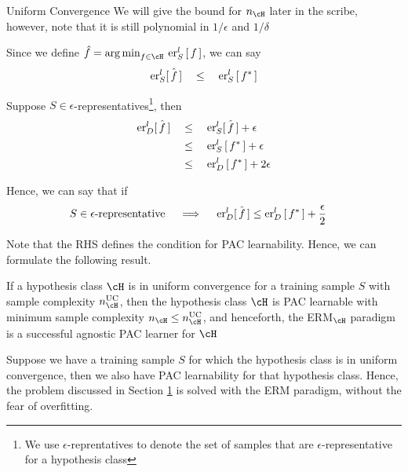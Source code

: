 \documentclass[11pt,a4paper]{article}
\begin{document}
\begin{ssection}[3]{Uniform Convergence}
	We will give the bound for $n_\cH$ later in the scribe, however, note that it is still polynomial in $1 / \epsilon$ and $1 / \delta$

	Since we define $\hat{f} = \argmin{f \in \cH} \err[_S^l]{f}$, we can say
	\begin{align*}
		\errs[_S^l]{f}	\qle	\err[_S^l]{f^\ast}
	\end{align*} \sbr

	Suppose $S \in \epsilon$-representatives\footnote{We use $\epsilon$-reprentatives to denote the set of samples that are $\epsilon$-representative for a hypothesis class}, then
	\begin{align*}
		\errs[_D^l]{f}	&\qle	\errs[_S^l]{f} + \epsilon \\
						&\qle	\err[_S^l]{f^\ast} + \epsilon \\
						&\qle	\err[_D^l]{f^\ast} + 2 \epsilon \\
	\end{align*} \sbr

	Hence, we can say that if
	\begin{align*}
		S \in \epsilon\text{-representative}	&\qimplies	\errs[_D^l]{f} \le	\err[_D^l]{f^\ast} + \frac{\epsilon}{2}
	\end{align*} \sbr

	Note that the RHS defines the condition for PAC learnability. Hence, we can formulate the following result.

	\begin{result}
		If a hypothesis class $\cH$ is in uniform convergence for a training sample $S$ with sample complexity $n_\cH^{\text{UC}}$, then the hypothesis class $\cH$ is PAC learnable with minimum sample complexity $n_\cH \le n_\cH^{\text{UC}}$, and henceforth, the ERM$_\cH$ paradigm is a successful agnostic PAC learner for $\cH$
		\label{res:unif-pac}
	\end{result}

	Suppose we have a training sample $S$ for which the hypothesis class is in uniform convergence, then we also have PAC learnability for that hypothesis class. Hence, the problem discussed in Section \hyperlink{sec:1}{1} is solved with the ERM paradigm, without the fear of overfitting.

\end{ssection}
\end{document}

